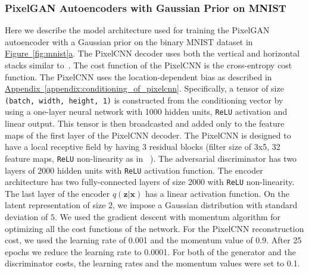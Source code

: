 \documentclass{article}
\newcommand{\myfigg}[2]{\hyperref[fig:#1]{Figure~\ref*{fig:#1}#2}}
\newcommand{\myappendix}[1]{\hyperref[appendix:#1]{Appendix~\ref*{appendix:#1}}}
\begin{document}
\begin{appendices}
\subsubsection{PixelGAN Autoencoders with Gaussian Prior on MNIST}\label{appendix:gaussian-mnist}
Here we describe the model architecture used for training the PixelGAN autoencoder with a Gaussian prior on the binary MNIST dataset in \myfigg{mnist}{a}.
The PixelCNN decoder uses both the vertical and horizontal stacks similar to~\citep{pixelcnn}. The cost function of the PixelCNN is the cross-entropy cost function. 
The PixelCNN uses the location-dependent bias as described in \myappendix{conditioning_of_pixelcnn}. Specifically, a tensor of size \texttt{(batch, width, height, 1)} is constructed from the conditioning vector by using a one-layer neural network with 1000 hidden units, \texttt{ReLU} activation and linear output. This tensor is then broadcasted and added only to the feature maps of the first layer of the PixelCNN decoder. 
The PixelCNN is designed to have a local receptive field by having 3 residual blocks (filter size of 3x5, 32 feature maps, \texttt{ReLU} non-linearity as in ~\citep{pixelcnn}). The adversarial discriminator has two layers of 2000 hidden units with \texttt{ReLU} activation function. 
The encoder architecture has two fully-connected layers of size 2000 with \texttt{ReLU} non-linearity. 
The last layer of the encoder $q(\mathbf{z}|\mathbf{x})$ has a linear activation function. On the latent representation of size $2$, we impose a Gaussian distribution with standard deviation of $5$. 
We used the gradient descent with momentum algorithm for optimizing all the cost functions of the network. 
For the PixelCNN reconstruction cost, we used the learning rate of 0.001 and the momentum value of 0.9. After 25 epochs we reduce the learning rate to 0.0001. For both of the generator and the discriminator costs, the learning rates and the momentum values were set to 0.1.


\end{appendices}
\end{document}
